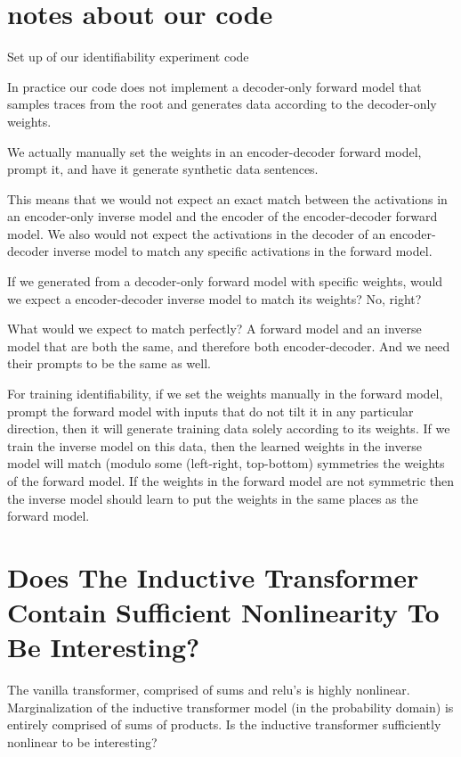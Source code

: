 \section{notes about our code}

Set up of our identifiability experiment code

In practice our code does not implement a decoder-only forward model that samples traces from the root and generates data according to the decoder-only weights.

We actually manually set the weights in an encoder-decoder forward model, prompt it, and have it generate synthetic data sentences.

This means that we would not expect an exact match between the activations in an encoder-only inverse model and the encoder of the encoder-decoder forward model.  We also would not expect the activations in the decoder of an encoder-decoder inverse model to match any specific activations in the forward model.

If we generated from a decoder-only forward model with specific weights, would we expect a encoder-decoder inverse model to match its weights?  No, right?

What would we expect to match perfectly?  A forward model and an inverse model that are both the same, and therefore both encoder-decoder.  And we need their prompts to be the same as well.

For training identifiability, if we set the weights manually in the forward model, prompt the forward model with inputs that do not tilt it in any particular direction, then it will generate training data solely according to its weights.  If we train the inverse model on this data, then the learned weights in the inverse model will match (modulo some (left-right, top-bottom) symmetries the weights of the forward model.  If the weights in the forward model are not symmetric then the inverse model should learn to put the weights in the same places as the forward model.

\section{Does The Inductive Transformer Contain Sufficient Nonlinearity To Be Interesting?}

The vanilla transformer, comprised of sums and relu's is highly nonlinear. 
 Marginalization of the inductive transformer model (in the probability domain) is entirely comprised of sums of products.  Is the inductive transformer sufficiently nonlinear to be interesting?

